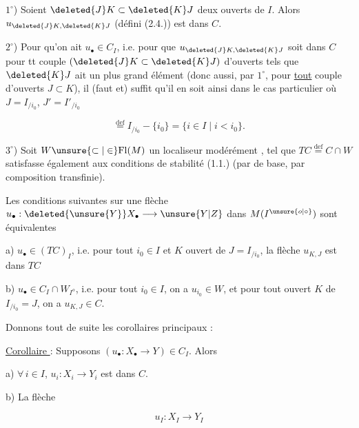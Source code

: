 $1^\circ$)  Soient $\deleted{J}K\subset\deleted{K}J$ deux ouverts de $I$. Alors $u_{\deleted{J}K,\deleted{K}J}$ (défini  (2.4.)) est dans $C$.

$2^\circ$)  Pour qu'on ait $u_\bullet\in C_I$, i.e. pour que $u_{\deleted{J}K,\deleted{K}J}$ soit dans $C$ pour tt couple $(\deleted{J}K\subset\deleted{K}J)$ d'ouverts tels que $\deleted{K}J$ ait un plus grand élément  (donc aussi, par $1^\circ$, pour \uline{tout} couple d'ouverts $J\subset K$), il (faut et) suffit qu'il en soit ainsi dans le cas particulier où $J=I_{/i_0}$, $J'=I'_{/i_0}$

\[
 \overset{\mathrm{def}}{=} I_{/i_0}-\{i_0\}=\{i\in I\mid i<i_0\}.
\]



$3^\circ$)  Soit $W\unsure{\subset|\in}\mathrm{Fl}(M)$ un localiseur modérément , tel que  $TC\overset{\mathrm{def}}{=}C\cap W$ satisfasse également aux conditions de stabilité (1.1.) (par  de base, par composition transfinie).


Les conditions suivantes sur une flèche $u_\bullet:\deleted{\unsure{Y}}X_\bullet\longrightarrow\unsure{Y|Z}$ dans $M(I^{\unsure{o|\circ}})$ sont équivalentes

a) $u_\bullet\in(TC)_I$, i.e. pour tout $i_0\in I$ et $K$ ouvert de $J=I_{/i_0}$, la flèche $u_{K,J}$ est dans $TC$

b) $u_\bullet\in C_I\cap W_{I^o}$, i.e.  pour tout $i_0\in I$, on a $u_{i_0}\in W$, et pour tout ouvert $K$ de $I_{/i_0}=J$, on a $u_{K,J}\in C$.

Donnons tout de suite les corollaires principaux :

\uline{Corollaire }: Supposons $(u_\bullet:X_\bullet\longrightarrow Y)\in C_I$. Alors

a) $\forall\,i\in I$, $u_i:X_i\longrightarrow Y_i$ est dans $C$.

b) \deleted{\unsure{$\forall$}} La flèche

\[
 u_I:X_I\longrightarrow Y_I\tag*{(2.2.1.)}
\]

